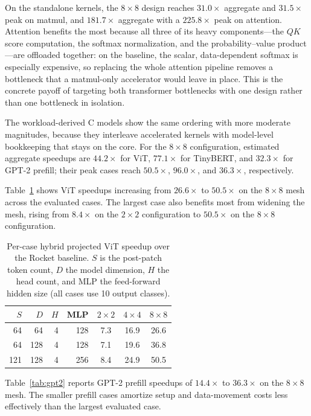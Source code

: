 \documentclass[sigconf,nonacm]{acmart}
\begin{document}
On the standalone kernels, the $8\times8$ design reaches $31.0\times$ aggregate
and $31.5\times$ peak on matmul, and $181.7\times$ aggregate with a $225.8\times$
peak on attention. Attention benefits the most because all three of its heavy
components---the $QK$ score computation, the softmax normalization, and the
probability--value product---are offloaded together: on the baseline, the
scalar, data-dependent softmax is especially expensive, so replacing the whole
attention pipeline removes a bottleneck that a matmul-only accelerator would
leave in place. This is the concrete payoff of targeting both transformer
bottlenecks with one design rather than one bottleneck in isolation.

The workload-derived C models show the same ordering with more moderate
magnitudes, because they interleave accelerated kernels with model-level
bookkeeping that stays on the core. For the $8\times8$ configuration, estimated
aggregate speedups are $44.2\times$ for ViT, $77.1\times$ for TinyBERT, and
$32.3\times$ for GPT-2 prefill; their peak cases reach $50.5\times$,
$96.0\times$, and $36.3\times$, respectively.

Table~\ref{tab:vit} shows ViT speedups increasing from $26.6\times$ to
$50.5\times$ on the $8\times8$ mesh across the evaluated cases. The largest
case also benefits most from widening the mesh, rising from $8.4\times$ on
the $2\times2$ configuration to $50.5\times$ on the $8\times8$ configuration.

\begin{table}[H]
  \centering
  \caption{Per-case hybrid projected ViT speedup over the Rocket baseline. $S$ is the post-patch
    token count, $D$ the model dimension, $H$ the head count, and MLP the
    feed-forward hidden size (all cases use 10 output classes).}
  \label{tab:vit}
  \begin{tabular}{rrrrccc}
    \toprule
    $S$ & $D$ & $H$ & MLP & $2\times2$ & $4\times4$ & $8\times8$ \\
    \midrule
    64  & 64  & 4 & 128 & 7.3 & 16.9 & 26.6 \\
    64  & 128 & 4 & 128 & 7.1 & 19.6 & 36.8 \\
    121 & 128 & 4 & 256 & 8.4 & 24.9 & 50.5 \\
    \bottomrule
  \end{tabular}
\end{table}

Table~\ref{tab:gpt2} reports GPT-2 prefill speedups of $14.4\times$ to
$36.3\times$ on the $8\times8$ mesh. The smaller prefill cases amortize setup
and data-movement costs less effectively than the largest evaluated case.
\end{document}
